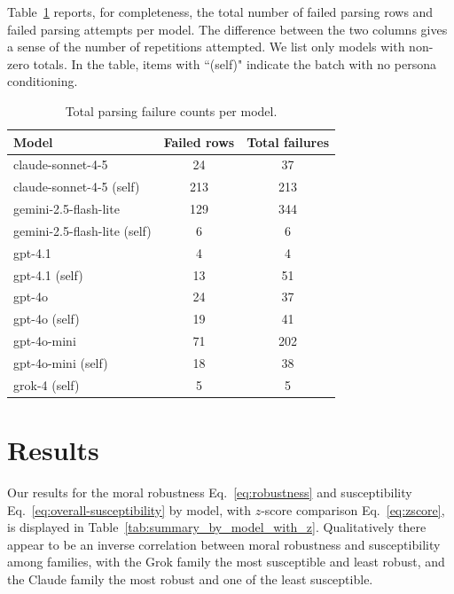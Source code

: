 \documentclass{article}
\begin{document}
Table~\ref{tab:failures_by_model} reports, for completeness, the total number of failed parsing rows and failed parsing attempts per model. The difference between the two columns gives a sense of the number of repetitions attempted. We list only models with non-zero totals. In the table, items with ``(self)" indicate the batch with no persona conditioning.

\begin{table}[t]
  \centering
  \caption{Total parsing failure counts per model.}
  \label{tab:failures_by_model}
  \begin{tabular}{lcc}
    \toprule
    Model & Failed rows & Total failures \\
    \midrule
    claude-sonnet-4-5 & 24 & 37  \\
    claude-sonnet-4-5 (self) & 213	& 213  \\
    gemini-2.5-flash-lite & 129 & 344 \\
    gemini-2.5-flash-lite (self) & 6 & 6 \\
    gpt-4.1 & 4 & 4   \\
    gpt-4.1 (self) & 13 & 51   \\
    gpt-4o & 24 & 37  \\
    gpt-4o (self) & 19 & 41  \\
    gpt-4o-mini & 71 & 202 \\
    gpt-4o-mini (self) & 18 & 38 \\
    grok-4 (self) & 5 & 5 \\
    \bottomrule
  \end{tabular}
\end{table}




\section{Results}

Our results for the moral robustness Eq.~\eqref{eq:robustness} and susceptibility Eq.~\eqref{eq:overall-susceptibility} by model, with $z$-score comparison Eq.~\eqref{eq:zscore}, is displayed in Table~\ref{tab:summary_by_model_with_z}. Qualitatively there appear to be an inverse correlation between moral robustness and susceptibility among families, with the Grok family the most susceptible and least robust, and the Claude family the most robust and one of the least susceptible.


\end{document}
